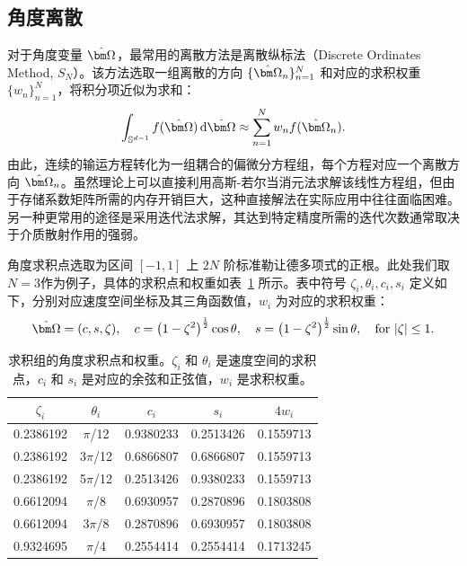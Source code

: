 \subsection{角度离散}
对于角度变量 $\bOmega$，最常用的离散方法是离散纵标法（Discrete Ordinates Method, $S_N$）。该方法选取一组离散的方向 $\{\bOmega_n\}_{n=1}^N$ 和对应的求积权重 $\{w_n\}_{n=1}^N$，将积分项近似为求和：
\begin{equation}
    \int_{\sS^{d-1}} f(\bOmega) \diff{\bOmega} \approx \sum_{n=1}^N w_n f(\bOmega_n).
\end{equation}
由此，连续的输运方程转化为一组耦合的偏微分方程组，每个方程对应一个离散方向 $\bOmega_n$。虽然理论上可以直接利用高斯-若尔当消元法求解该线性方程组，但由于存储系数矩阵所需的内存开销巨大，这种直接解法在实际应用中往往面临困难。另一种更常用的途径是采用迭代法求解，其达到特定精度所需的迭代次数通常取决于介质散射作用的强弱。


角度求积点选取为区间 $[-1,1]$ 上 $2N$ 阶标准勒让德多项式的正根。此处我们取 $N=3$作为例子，具体的求积点和权重如表~\ref{tab:quadrature} 所示。表中符号 $\zeta_i, \theta_i, c_i, s_i$ 定义如下，分别对应速度空间坐标及其三角函数值，$w_i$ 为对应的求积权重：
\begin{equation}
    \bOmega=(c,s,\zeta), \quad c =
        {\left(1-\zeta^{2}\right)}^{\frac{1}{2}} \cos\theta, \quad s =
        {\left(1-\zeta^{2}\right)}^{\frac{1}{2}} \sin\theta, \quad \text{for }|\zeta| \leq 1.
\end{equation}

\begin{table}[htbp]
    \centering
    \begin{tabular}{ccccc}
        \toprule
        $\zeta_i$ & $\theta_i$ & $c_i$     & $s_i$     & $4 w_i$   \\
        \midrule
        0.2386192 & $\pi$/12   & 0.9380233 & 0.2513426 & 0.1559713 \\
        0.2386192 & 3$\pi$/12  & 0.6866807 & 0.6866807 & 0.1559713 \\
        0.2386192 & 5$\pi$/12  & 0.2513426 & 0.9380233 & 0.1559713 \\
        0.6612094 & $\pi$/8    & 0.6930957 & 0.2870896 & 0.1803808 \\
        0.6612094 & 3$\pi$/8   & 0.2870896 & 0.6930957 & 0.1803808 \\
        0.9324695 & $\pi$/4    & 0.2554414 & 0.2554414 & 0.1713245 \\
        \bottomrule
    \end{tabular}
    \caption{求积组的角度求积点和权重。$\zeta_i$ 和 $\theta_i$ 是速度空间的求积点，$c_i$ 和 $s_i$ 是对应的余弦和正弦值，$w_i$ 是求积权重。}\label{tab:quadrature}
\end{table}

